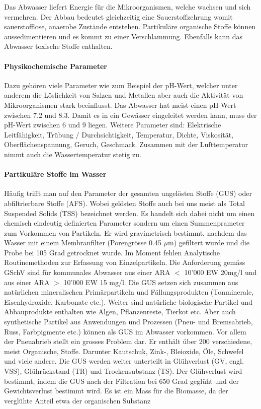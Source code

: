 \documentclass[9pt, openright=false]{scrartcl}
\begin{document}
Das Abwasser liefert Energie für die Mikroorganismen, welche wachsen und sich vermehren. Der Abbau bedeutet gleichzeitig eine Sauerstoffzehrung womit sauerstofflose, anaerobe Zustände entstehen. Partikuläre organische Stoffe können aussedimentieren und es kommt zu einer Verschlammung. Ebenfalls kann das Abwasser toxische Stoffe enthalten. \paragraph{Physikochemische Parameter} Dazu gehören viele Parameter wie zum Beispiel der pH-Wert, welcher unter anderem die Löslichkeit von Salzen und Metallen aber auch die Aktivität von Mikroorganismen stark beeinflusst. Das Abwasser hat meist einen pH-Wert zwischen 7.2 und 8.3. Damit es in ein Gewässer eingeleitet werden kann, muss der pH-Wert zwischen 6 und 9 liegen. Weitere Parameter sind: Elektrische Leitfähigkeit, Trübung / Durchsichtigkeit, Temperatur, Dichte, Viskosität, Oberflächenspannung, Geruch, Geschmack. Zusammen mit der Lufttemperatur nimmt auch die Wassertemperatur stetig zu. \paragraph{Partikuläre Stoffe im Wasser} Häufig trifft man auf den Parameter der gesamten ungelösten Stoffe (GUS) oder abfiltrierbare Stoffe (AFS). Wobei gelösten Stoffe auch bei uns meist als Total Suspended Solids (TSS) bezeichnet werden. Es handelt sich dabei nicht um einen chemisch eindeutig definierten Parameter sondern um einen Summenprameter zum Vorkommen von Partikeln. Er wird gravimetrisch bestimmt, nachdem das Wasser mit einem Membranfilter (Porengrösse 0.45 $\mu$m) gefiltert wurde und die Probe bei 105 Grad getrocknet wurde. Im Moment fehlen Analytische Routinemethoden zur Erfassung von Einzelpartikeln. Die Anforderung gemäss GSchV sind für kommunales Abwasser aus einer ARA $<$ 10'000 EW 20mg/l und aus einer ARA $>$ 10'000 EW 15 mg/l. Die GUS setzen sich zusammen aus natürlichen mineralischen Primärpartikeln und Fällungsprodukten (Tonminerale, Eisenhydroxide, Karbonate etc.). Weiter sind natürliche biologische Partikel und Abbauprodukte enthalten wie Algen, Pflanzenreste, Tierkot etc. Aber auch synthetische Partikel aus Anwendungen und Prozessen (Pneu- und Bremsabrieb, Russ, Farbpigmente etc.) können als GUS im Abwasser vorkommen. Vor allem der Pneuabrieb stellt ein grosses Problem dar. Er enthält über 200 verschiedene, meist Organische, Stoffe. Darunter Kautschuk, Zink-, Bleioxide, Öle, Schwefel und viele andere. Die GUS werden weiter unterteilt in Glühverlust (GV, engl. VSS), Glührückstand (TR) und Trockensubstanz (TS). Der Glühverlust wird bestimmt, indem die GUS nach der Filtration bei 650 Grad geglüht und der Gewichtsverlust bestimmt wird. Es ist ein Mass für die Biomasse, da der verglühte Anteil etwa der organischen Substanz 
\end{document}
